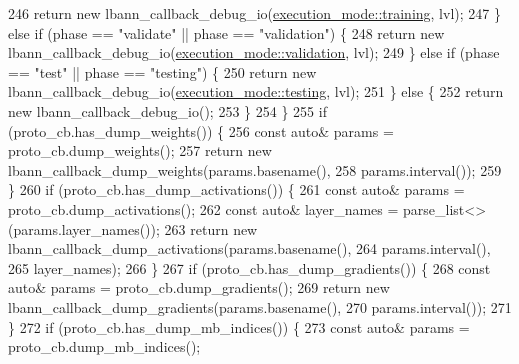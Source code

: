 \begin{DoxyCode}
246       \textcolor{keywordflow}{return} \textcolor{keyword}{new} lbann\_callback\_debug\_io(\hyperlink{base_8hpp_a2781a159088df64ed7d47cc91c4dc0a8ac185ddac8b5a8f5aa23c5b80bc12d214}{execution\_mode::training}, lvl);
247     \} \textcolor{keywordflow}{else} \textcolor{keywordflow}{if} (phase == \textcolor{stringliteral}{"validate"} || phase == \textcolor{stringliteral}{"validation"}) \{
248       \textcolor{keywordflow}{return} \textcolor{keyword}{new} lbann\_callback\_debug\_io(\hyperlink{base_8hpp_a2781a159088df64ed7d47cc91c4dc0a8aa617908b172c473cb8e8cda059e55bf0}{execution\_mode::validation}, lvl);
249     \} \textcolor{keywordflow}{else} \textcolor{keywordflow}{if} (phase == \textcolor{stringliteral}{"test"} || phase == \textcolor{stringliteral}{"testing"}) \{
250       \textcolor{keywordflow}{return} \textcolor{keyword}{new} lbann\_callback\_debug\_io(\hyperlink{base_8hpp_a2781a159088df64ed7d47cc91c4dc0a8aae2b1fca515949e5d54fb22b8ed95575}{execution\_mode::testing}, lvl);
251     \} \textcolor{keywordflow}{else} \{
252       \textcolor{keywordflow}{return} \textcolor{keyword}{new} lbann\_callback\_debug\_io();
253     \}
254   \}
255   \textcolor{keywordflow}{if} (proto\_cb.has\_dump\_weights()) \{
256     \textcolor{keyword}{const} \textcolor{keyword}{auto}& params = proto\_cb.dump\_weights();
257     \textcolor{keywordflow}{return} \textcolor{keyword}{new} lbann\_callback\_dump\_weights(params.basename(),
258                                            params.interval());
259   \}
260   \textcolor{keywordflow}{if} (proto\_cb.has\_dump\_activations()) \{
261     \textcolor{keyword}{const} \textcolor{keyword}{auto}& params = proto\_cb.dump\_activations();
262     \textcolor{keyword}{const} \textcolor{keyword}{auto}& layer\_names = parse\_list<>(params.layer\_names());
263     \textcolor{keywordflow}{return} \textcolor{keyword}{new} lbann\_callback\_dump\_activations(params.basename(),
264                                                params.interval(),
265                                                layer\_names);
266   \}
267   \textcolor{keywordflow}{if} (proto\_cb.has\_dump\_gradients()) \{
268     \textcolor{keyword}{const} \textcolor{keyword}{auto}& params = proto\_cb.dump\_gradients();
269     \textcolor{keywordflow}{return} \textcolor{keyword}{new} lbann\_callback\_dump\_gradients(params.basename(),
270                                              params.interval());
271   \}
272   \textcolor{keywordflow}{if} (proto\_cb.has\_dump\_mb\_indices()) \{
273     \textcolor{keyword}{const} \textcolor{keyword}{auto}& params = proto\_cb.dump\_mb\_indices();

\end{DoxyCode}

